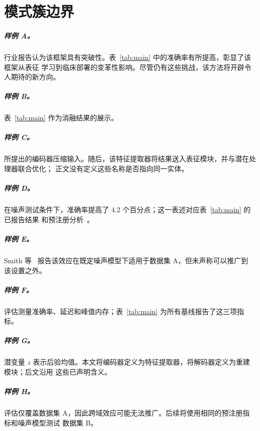 \chapter{模式簇边界}\label{chap:pattern-clusters}

\paragraph{样例 A。}
行业报告认为该框架具有突破性。表~\ref{tab:main} 中的准确率有所提高，彰显了该框架从表征
学习到临床部署的变革性影响。尽管仍有这些挑战，该方法将开辟令人期待的新方向。

\paragraph{样例 B。}
表~\ref{tab:main} 作为消融结果的展示。

\paragraph{样例 C。}
所提出的编码器压缩输入。随后，该特征提取器将结果送入表征模块，并与潜在处理器联合优化；
正文没有定义这些名称是否指向同一实体。

\paragraph{样例 D。}
在噪声测试条件下，准确率提高了 4.2 个百分点；这一表述对应表~\ref{tab:main} 的已报告结果
和预注册分析~\cite{smith2024}。

\paragraph{样例 E。}
Smith 等~\cite{smith2024} 报告该效应在既定噪声模型下适用于数据集 A，但未声称可以推广到
该设置之外。

\paragraph{样例 F。}
评估测量准确率、延迟和峰值内存；表~\ref{tab:main} 为所有基线报告了这三项指标。

\paragraph{样例 G。}
潜变量 $z$ 表示后验均值。本文将编码器定义为特征提取器，将解码器定义为重建模块；后文沿用
这些已声明含义。

\paragraph{样例 H。}
评估仅覆盖数据集 A，因此跨域效应可能无法推广。后续将使用相同的预注册指标和噪声模型测试
数据集 B。

